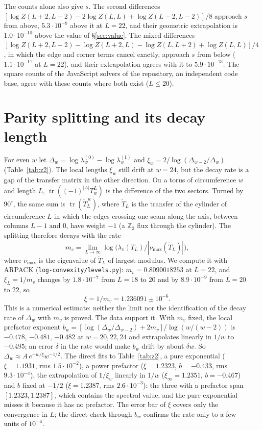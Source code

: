 \documentclass[11pt]{amsart}
\theoremstyle{definition}
\theoremstyle{remark}
\newcommand{\Z}{\mathbb{Z}}
\newcommand{\file}[1]{\texttt{#1}}
\begin{document}
The counts alone also give $s$. The second differences
$[\log Z(L+2, L+2) - 2\log Z(L, L) + \log Z(L-2, L-2)]/8$ approach $s$ from above, $5.3\cdot10^{-9}$
above it at $L = 22$, and their geometric extrapolation is $1.0\cdot10^{-10}$ above the value of
\S\ref{sec:value}. The mixed differences
$[\log Z(L+2, L+2) - \log Z(L+2, L) - \log Z(L, L+2) + \log Z(L, L)]/4$, in which the edge and
corner terms cancel exactly, approach $s$ from below ($1.1\cdot10^{-11}$ at $L = 22$), and their
extrapolation agrees with it to $5.9\cdot10^{-13}$. The square counts of the JavaScript solvers of
the repository, an independent code base, agree with these counts where both exist ($L \le 20$).

\section{Parity splitting and its decay length}\label{sec:z2}
For even $w$ let $\Delta_w = \log\lambda^{(0)}_w - \log\lambda^{(1)}_w$ and
$\xi_w = 2/\log(\Delta_{w-2}/\Delta_w)$ (Table~\ref{tab:z2}). The local lengths $\xi_w$ still drift
at $w = 24$, but the decay rate is a gap of the transfer matrix in the other direction. On a torus
of circumference $w$ and length $L$, $\operatorname{tr}((-1)^{|A|} T_w^L)$ is the difference of the
two sectors. Turned by $90^\circ$, the same sum is $\operatorname{tr}(\tilde T_L^{\,w})$, where
$\tilde T_L$ is the transfer of the cylinder of circumference $L$ in which the edges crossing one seam
along the axis, between columns $L - 1$ and $0$, have weight $-1$ (a $\Z_2$ flux through the
cylinder). The splitting therefore decays with the rate
\[
  m_v = \lim_{L\to\infty} \log\bigl(\lambda_1(T_L)/|\nu_{\max}(\tilde T_L)|\bigr),
\]
where $\nu_{\max}$ is the eigenvalue of $\tilde T_L$ of largest modulus. We compute it with ARPACK
(\file{log-convexity/levels.py}): $m_v = 0.8090018253$ at $L = 22$, and $\xi_L = 1/m_v$ changes by
$1.8\cdot10^{-7}$ from $L = 18$ to $20$ and by $8.9\cdot10^{-9}$ from $L = 20$ to $22$, so
\[
  \xi = 1/m_v = 1.236091 \pm 10^{-6}.
\]
This is a numerical estimate: neither the limit nor the identification of the decay rate of
$\Delta_w$ with $m_v$ is proved. The data support it. With $m_v$ fixed, the local prefactor exponent
$b_w = [\log(\Delta_w/\Delta_{w-2}) + 2m_v]/\log(w/(w-2))$ is $-0.478$, $-0.481$, $-0.482$ at
$w = 20, 22, 24$ and extrapolates linearly in $1/w$ to $-0.495$; an error $\delta$ in the rate would
make $b_w$ drift by about $\delta w$. So $\Delta_w \approx A\, e^{-w/\xi} w^{-1/2}$. The direct fits
to Table~\ref{tab:z2}, a pure exponential ($\xi = 1.1931$, rms $1.5\cdot10^{-2}$), a power prefactor
($\xi = 1.2323$, $b = -0.433$, rms $9.3\cdot10^{-4}$), the extrapolation of $1/\xi_w$ linearly in
$1/w$ ($\xi_\infty = 1.2351$, $b = -0.467$) and $b$ fixed at $-1/2$ ($\xi = 1.2387$, rms
$2.6\cdot10^{-3}$): the three with a prefactor span $[1.2323, 1.2387]$, which contains the spectral
value, and the pure exponential misses it because it has no prefactor. The error bar of $\xi$ covers
only the convergence in $L$; the direct check through $b_w$ confirms the rate only to a
few units of $10^{-4}$.
\end{document}
